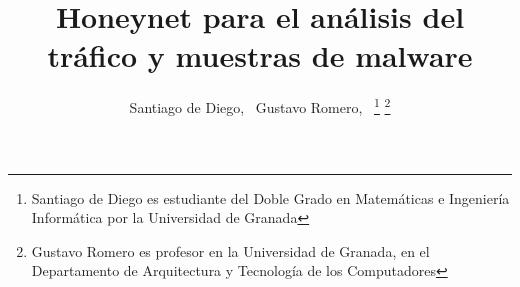 \documentclass[journal]{IEEEtran}
\begin{document}
%
\title{Honeynet para el análisis del tráfico y muestras de malware}
%
%
%

\author{Santiago de Diego,~
        Gustavo Romero,~
\thanks{Santiago de Diego es estudiante del Doble Grado en Matemáticas e Ingeniería Informática por la Universidad de Granada}%
\thanks{Gustavo Romero es profesor en la Universidad de Granada, en el Departamento de Arquitectura y Tecnología de los Computadores}}

% 
%



\markboth{}%
{}
% 
\end{document}
